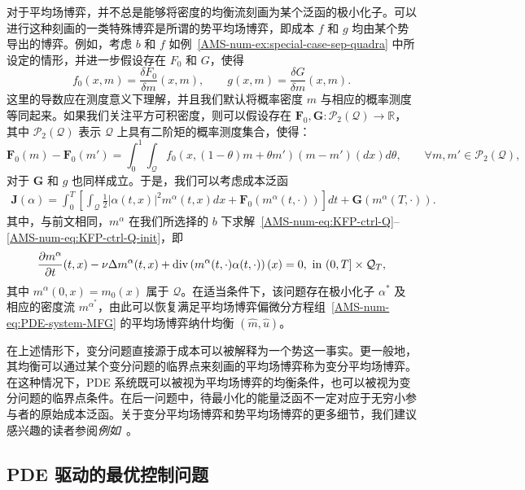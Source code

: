 \documentclass{amsproc}
\theoremstyle{definition}
\theoremstyle{remark}
\numberwithin{equation}{section}
\newcommand{\RR}{{\mathbb R}}
\newcommand{\bF}{{\mathbf F}}
\newcommand{\bG}{{\mathbf G}}
\newcommand{\bJ}{{\mathbf J}}
\newcommand{\cP}{{\mathcal P}}
\newcommand{\ctrl}{\alpha}
\newcommand{\dom}{\mathcal{Q}}
\newcommand{\domT}{\mathcal{Q}_{T}}
\newcommand{\diver}{\mathrm{div}}
\begin{document}
对于平均场博弈，并不总是能够将密度的均衡流刻画为某个泛函的极小化子。可以进行这种刻画的一类特殊博弈是所谓的势平均场博弈，即成本 $f$ 和 $g$ 均由某个势导出的博弈。例如，考虑 $b$ 和 $f$ 如例~\ref{AMS-num-ex:special-case-sep-quadra} 中所设定的情形，并进一步假设存在 $F_0$ 和 $G$，使得
$$
	f_0(x,m) = \frac{\delta F_0}{\delta m}(x,m), 
	\qquad g (x,m) = \frac{\delta G}{\delta m}(x,m).
$$
这里的导数应在测度意义下理解，并且我们默认将概率密度 $m$ 与相应的概率测度等同起来。如果我们关注平方可积密度，则可以假设存在 $\bF_0, \bG: \cP_2(\dom) \to \RR$，其中 $\cP_2(\dom)$ 表示 $\dom$ 上具有二阶矩的概率测度集合，使得：
$$
	\bF_0(m) - \bF_0(m') = \int_0^1 \int_{\dom} f_0(x, (1-\theta) m + \theta m') (m-m')(dx)  d\theta, \qquad \forall m,m' \in \cP_2(\dom),
$$ 
对于 $\bG$ 和 $g$ 也同样成立。于是，我们可以考虑成本泛函
\begin{align*}
	\bJ(\ctrl) = \int_0^T \left[ \int_{\dom} \frac{1}{2}|\ctrl(t,x)|^2 m^{\ctrl}(t,x) dx + \bF_0(m^{\ctrl}(t,\cdot)) \right]  dt + \bG(m^{\ctrl}(T,\cdot)). 
\end{align*}
其中，与前文相同，$m^{\ctrl}$ 在我们所选择的 $b$ 下求解~\eqref{AMS-num-eq:KFP-ctrl-Q}--\eqref{AMS-num-eq:KFP-ctrl-Q-init}，即
\begin{equation*}
	\frac{\partial m^{\ctrl}}{\partial t}(t,x)  - \nu \Delta m^{\ctrl}(t,x) + \diver\left( m^{\ctrl}(t,\cdot) \ctrl(t,\cdot) \right)(x) = 0, 
	\hbox{ in } (0,T] \times \domT ,
\end{equation*}
其中 $m^{\ctrl}(0,x) = m_0(x)$ 属于 $\dom$。在适当条件下，该问题存在极小化子 $\ctrl^*$ 及相应的密度流 $m^{\ctrl^*}$，由此可以恢复满足平均场博弈偏微分方程组~\eqref{AMS-num-eq:PDE-system-MFG} 的平均场博弈纳什均衡 $(\hat m, \hat u)$。

在上述情形下，变分问题直接源于成本可以被解释为一个势这一事实。更一般地，其均衡可以通过某个变分问题的临界点来刻画的平均场博弈称为变分平均场博弈。在这种情况下，PDE 系统既可以被视为平均场博弈的均衡条件，也可以被视为变分问题的临界点条件。在后一问题中，待最小化的能量泛函不一定对应于无穷小参与者的原始成本泛函。关于变分平均场博弈和势平均场博弈的更多细节，我们建议感兴趣的读者参阅\textit{例如}~\cite{Cardaliaguet-2013-notes,MR3644590}。






\subsection{PDE 驱动的最优控制问题}

\label{AMS-num-subsec:PDE-optc}
\end{document}
